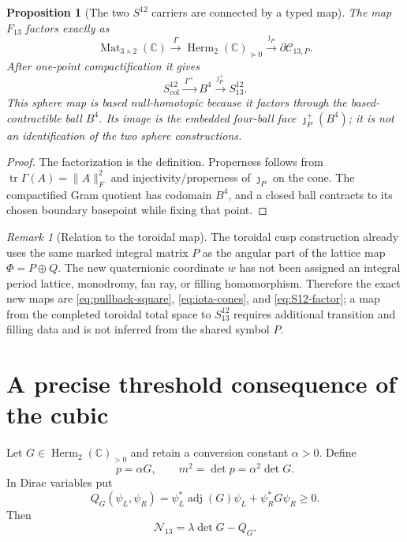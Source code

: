\documentclass[11pt]{article}
\newtheorem{proposition}[theorem]{Proposition}
\theoremstyle{definition}
\theoremstyle{remark}
\newtheorem{remark}[theorem]{Remark}
\newcommand{\C}{\mathbb C}
\newcommand{\Herm}{\operatorname{Herm}}
\newcommand{\Mat}{\operatorname{Mat}}
\newcommand{\tr}{\operatorname{tr}}
\newcommand{\adj}{\operatorname{adj}}
\newcommand{\cC}{\mathcal C}
\newcommand{\cN}{\mathcal N}
\begin{document}
\begin{proposition}[The two $S^{12}$ carriers are connected by a typed map]\label{prop:S12-map}
The map $F_{13}$ factors exactly as
\begin{equation}\label{eq:S12-factor}
 \Mat_{3\times2}(\C)
 \xrightarrow{\ \Gamma\ }
 \Herm_2(\C)_{\succeq0}
 \xrightarrow{\ \jmath_P\ }
 \partial\cC_{13,P}.
\end{equation}
After one-point compactification it gives
\begin{equation}\label{eq:S12-compact-map}
 \boxed{
 S^{12}_{\mathrm{col}}
 \xrightarrow{\ \Gamma^+\ }
 B^4
 \xrightarrow{\ \jmath_P^+\ }
 S^{12}_{13}.}
\end{equation}
This sphere map is based null-homotopic because it factors through the based-contractible ball $B^4$.  Its image is the embedded four-ball face $\jmath_P^+(B^4)$; it is not an identification of the two sphere constructions.
\end{proposition}

\begin{proof}
The factorization is the definition.  Properness follows from
$\tr\Gamma(A)=\|A\|_F^2$ and injectivity/properness of $\jmath_P$ on the cone.  The compactified Gram quotient has codomain $B^4$, and a closed ball contracts to its chosen boundary basepoint while fixing that point.
\end{proof}

\begin{remark}[Relation to the toroidal map]
The toroidal cusp construction already uses the same marked integral matrix $P$ as the angular part of the lattice map $\Phi=P\oplus Q$.  The new quaternionic coordinate $w$ has not been assigned an integral period lattice, monodromy, fan ray, or filling homomorphism.  Therefore the exact new maps are \eqref{eq:pullback-square}, \eqref{eq:iota-cones}, and \eqref{eq:S12-factor}; a map from the completed toroidal total space to $S^{12}_{13}$ requires additional transition and filling data and is not inferred from the shared symbol $P$.
\end{remark}

\section{A precise threshold consequence of the cubic}

Let $G\in\Herm_2(\C)_{>0}$ and retain a conversion constant $\alpha>0$.  Define
\begin{equation}\label{eq:momentum}
 p=\alpha G,
 \qquad m^2=\det p=\alpha^2\det G.
\end{equation}
In Dirac variables put
\begin{equation}\label{eq:QD}
 Q_G(\psi_L,\psi_R)
 =\psi_L^*\adj(G)\psi_L+\psi_R^*G\psi_R\ge0.
\end{equation}
Then
\begin{equation}\label{eq:N-threshold}
 \cN_{13}=\lambda\det G-Q_G.
\end{equation}
\end{document}
